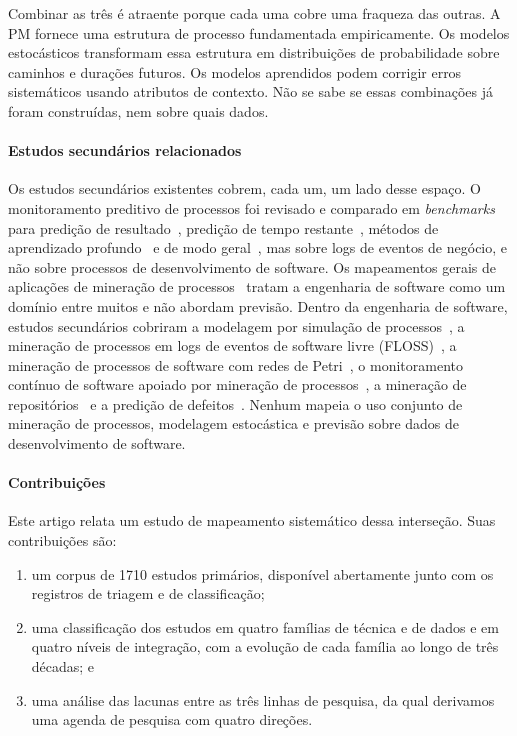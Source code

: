 \documentclass[preprint,12pt,authoryear=false]{elsarticle}
\begin{document}
Combinar as três é atraente porque cada uma cobre uma fraqueza das outras. A PM fornece uma estrutura de processo fundamentada empiricamente. Os modelos estocásticos transformam essa estrutura em distribuições de probabilidade sobre caminhos e durações futuros. Os modelos aprendidos podem corrigir erros sistemáticos usando atributos de contexto. Não se sabe se essas combinações já foram construídas, nem sobre quais dados.

\paragraph{Estudos secundários relacionados}
Os estudos secundários existentes cobrem, cada um, um lado desse espaço. O monitoramento preditivo de processos foi revisado e comparado em \emph{benchmarks} para predição de resultado~\cite{teinemaa2019}, predição de tempo restante~\cite{verenich2019}, métodos de aprendizado profundo~\cite{ramamaneiro2023} e de modo geral~\cite{marquez2018}, mas sobre logs de eventos de negócio, e não sobre processos de desenvolvimento de software. Os mapeamentos gerais de aplicações de mineração de processos~\cite{garcia2019,thiede2018} tratam a engenharia de software como um domínio entre muitos e não abordam previsão. Dentro da engenharia de software, estudos secundários cobriram a modelagem por simulação de processos~\cite{zhang2010,ali2014}, a mineração de processos em logs de eventos de software livre (FLOSS)~\cite{mukala2015}, a mineração de processos de software com redes de Petri~\cite{thamizharasan2016}, o monitoramento contínuo de software apoiado por mineração de processos~\cite{stepanov2026}, a mineração de repositórios~\cite{kagdi2007} e a predição de defeitos~\cite{hall2012}. Nenhum mapeia o uso conjunto de mineração de processos, modelagem estocástica e previsão sobre dados de desenvolvimento de software.

\paragraph{Contribuições}
Este artigo relata um estudo de mapeamento sistemático dessa interseção. Suas contribuições são:
\begin{enumerate}
\item um corpus de 1710 estudos primários, disponível abertamente junto com os registros de triagem e de classificação;
\item uma classificação dos estudos em quatro famílias de técnica e de dados e em quatro níveis de integração, com a evolução de cada família ao longo de três décadas; e
\item uma análise das lacunas entre as três linhas de pesquisa, da qual derivamos uma agenda de pesquisa com quatro direções.
\end{enumerate}
\end{document}
